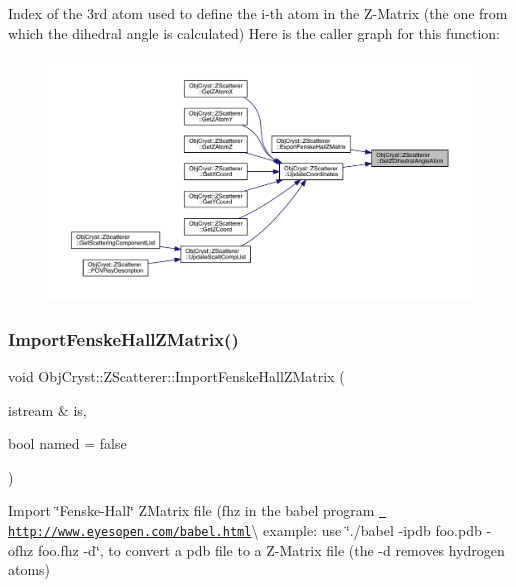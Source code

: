 Index of the 3rd atom used to define the i-\/th atom in the Z-\/\+Matrix (the one from which the dihedral angle is calculated) Here is the caller graph for this function\+:
\nopagebreak
\begin{figure}[H]
\begin{center}
\leavevmode
\includegraphics[width=350pt]{class_obj_cryst_1_1_z_scatterer_a8ab9425588c99c32c4c8c68ebe641723_icgraph}
\end{center}
\end{figure}
\mbox{\label{class_obj_cryst_1_1_z_scatterer_a097d27206e6e54259bb987a06d65f71c}} 
\subsubsection{\texorpdfstring{ImportFenskeHallZMatrix()}{ImportFenskeHallZMatrix()}}
{\footnotesize\ttfamily void Obj\+Cryst\+::\+Z\+Scatterer\+::\+Import\+Fenske\+Hall\+Z\+Matrix (\begin{DoxyParamCaption}\item[{istream \&}]{is,  }\item[{bool}]{named = {\ttfamily false} }\end{DoxyParamCaption})}

Import \char`\"{}\+Fenske-\/\+Hall\char`\"{} Z\+Matrix file (fhz in the babel program \href{http://www.eyesopen.com/babel.html}{\texttt{ http\+://www.\+eyesopen.\+com/babel.\+html}}\textbackslash{} example\+: use \char`\"{}./babel -\/ipdb foo.\+pdb -\/ofhz foo.\+fhz -\/d\char`\"{}, to convert a pdb file to a Z-\/\+Matrix file (the -\/d removes hydrogen atoms)


